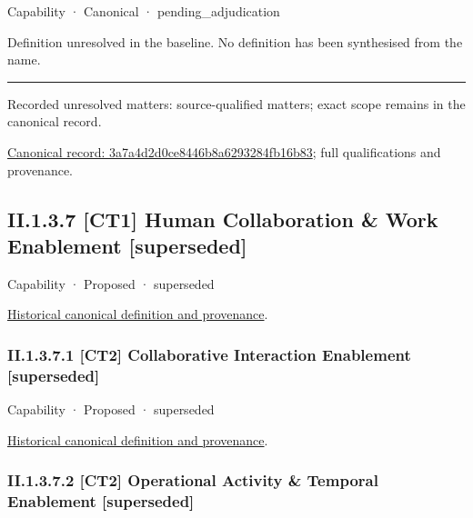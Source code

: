 \label{element:3a7a4d2d0ce8446b8a6293284fb16b83}
{\small Capability · Canonical · pending\_adjudication}\par

Definition unresolved in the baseline. No definition has been synthesised from the name.



\medskip\hrule\medskip

{\small Recorded unresolved matters: source-qualified matters; exact scope remains in the canonical record.}\par
{\footnotesize \href{../../../../continuum/strategy/capability/3a7a4d2d0ce8446b8a6293284fb16b83.md}{Canonical record: 3a7a4d2d0ce8446b8a6293284fb16b83}; full qualifications and provenance.}\par
\subsection*{II.1.3.7 [CT1] Human Collaboration \& Work Enablement [superseded]}
\label{navigation:II.1.3.7}

\label{element:c9347f73b21242c5b8cce41252b74da0}
{\small Capability · Proposed · superseded}\par
\href{../../../../continuum/strategy/capability/c9347f73b21242c5b8cce41252b74da0.md}{Historical canonical definition and provenance}.\par
\subsubsection*{II.1.3.7.1 [CT2] Collaborative Interaction Enablement [superseded]}
\label{navigation:II.1.3.7.1}

\label{element:6140b21c874241d092708e2411caceed}
{\small Capability · Proposed · superseded}\par
\href{../../../../continuum/strategy/capability/6140b21c874241d092708e2411caceed.md}{Historical canonical definition and provenance}.\par
\subsubsection*{II.1.3.7.2 [CT2] Operational Activity \& Temporal Enablement [superseded]}
\label{navigation:II.1.3.7.2}

